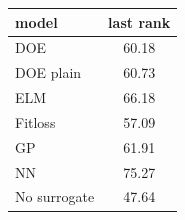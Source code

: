 \begin{tabular}{|lc|}
\hline
model & last rank\\
\hline
DOE & 60.18 \\
DOE plain & 60.73 \\
ELM & 66.18 \\
Fitloss & 57.09 \\
GP & 61.91 \\
NN & 75.27 \\
No surrogate & 47.64 \\
\hline
\end{tabular}
